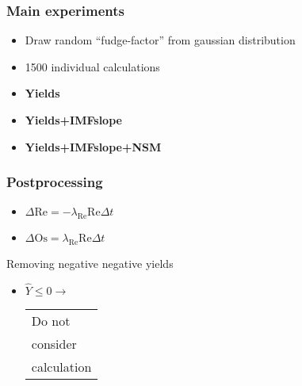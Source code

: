 
\begin{frame}
\frametitle{Main experiments}
\begin{itemize}
\item Draw random ``fudge-factor'' from gaussian distribution
\item 1500 individual calculations
\item \textbf{Yields}
\item \textbf{Yields+IMFslope}
\item \textbf{Yields+IMFslope+NSM}
\end{itemize}
\end{frame}

\begin{frame}
  \frametitle{Postprocessing}
  \begin{minipage}[t][1cm][t]{0.45\linewidth}
    \betadecay
    \begin{itemize}
      \item $\Delta \mathrm{Re} = -\lambda_{\scriptscriptstyle \mathrm{Re}} \mathrm{Re} \Delta t$
      \item $\Delta \mathrm{Os} = \lambda_{\scriptscriptstyle \mathrm{Re}} \mathrm{Re} \Delta t$
    \end{itemize}
  \end{minipage}
  \hfill
  \begin{minipage}[t][1cm][t]{0.45\linewidth}
    Removing negative negative yields
    \begin{itemize}
      \item $\hat{Y} \leq 0 \rightarrow$ \begin{tabular}{l}Do not \\ consider \\ calculation \end{tabular}
    \end{itemize}
  \end{minipage}
\end{frame}
